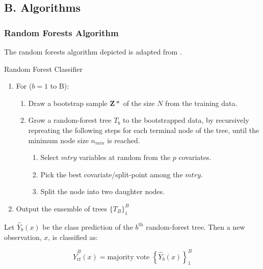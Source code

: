 \documentclass[12pt,]{article}
\newcommand{\appendixB}{ \setcounter{table}{0} \renewcommand{\thetable}{B\arabic{table}} \setcounter{figure}{0} \renewcommand{\thefigure}{B\arabic{figure}} }
\begin{document}
\subsection*{B. Algorithms}\label{b.-algorithms}

\appendixB

\subsubsection{Random Forests Algorithm}\label{random-forests-algorithm}

The random forests algorithm depicted is adapted from
\autocite{hastie_elements_2009}.

\begin{algorithm}[H]
\label{alg:random-forests-alg}
\caption{Random Forest Classifier}
\DontPrintSemicolon
\SetAlgoLined
\BlankLine

\begin{enumerate}
  \item For ($b=1$ to B):
    \begin{enumerate}
      \item Draw a bootstrap sample $\mathbf{Z*}$ of the size $N$ from the training data.
      \item Grow a random-forest tree $T_b$ to the bootstrapped data, by recursively repreating the following steps for each terminal node of the tree, until the minimum node size $n_{min}$ is reached.
      \begin{enumerate}
        \item Select $mtry$ variables at random from the $p$ covariates. 
        \item Pick the best covariate/split-point among the $mtry$. 
        \item Split the node into two daughter nodes. 
      \end{enumerate}
    \end{enumerate}
  \item Output the ensemble of trees $\{T_B\}^B_1$
\end{enumerate}
\BlankLine

Let $\hat{Y}_b(x)$ be the class prediction of the $b^{\text{th}}$ random-forest tree.  Then a new observation, $x$, is classified as:

$$\hat{Y}^B_{\text{rf}}(x) = \text{majority vote } \left\{ \hat{Y}_b(x) \right\}^B_1$$

\end{algorithm}
\end{document}
